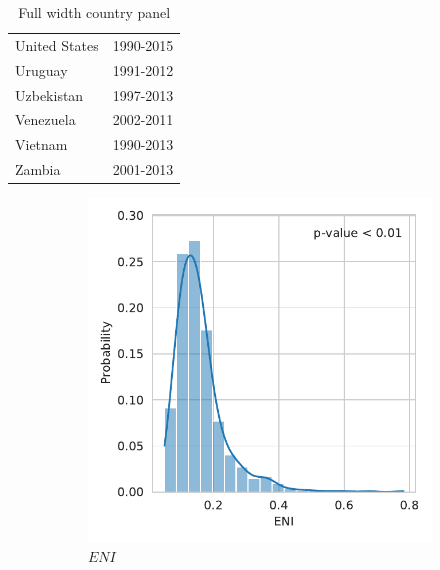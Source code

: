 \documentclass[12pt,a4paper]{article}
\begin{document}
\begin{table}[htbp]
\begin{subtable}{0.45\textwidth}
\begin{tabular}{ll}
             United States &  1990-2015 \\
                   Uruguay &  1991-2012 \\
                Uzbekistan &  1997-2013 \\
                 Venezuela &  2002-2011 \\
                   Vietnam &  1990-2013 \\
                    Zambia &  2001-2013 \\
\bottomrule
\end{tabular}
\end{subtable}
\caption{Full width country panel}
\label{tab:all_countries}
\end{table}


\begin{figure}[htbp]
\centering
\begin{subfigure}{0.45\textwidth}
\includegraphics[width=\textwidth]{./plots/dis/distplot_ENI.pdf}
\caption{$ENI$}
\end{subfigure}
\begin{subfigure}{0.45\textwidth}

\end{subfigure}
\end{figure}
\end{document}
